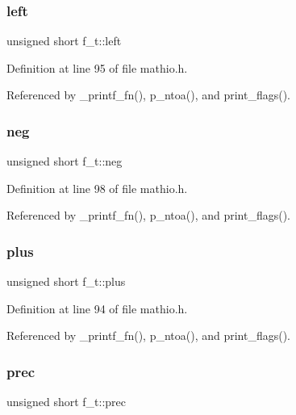 \subsubsection{\texorpdfstring{left}{left}}
{\footnotesize\ttfamily unsigned short f\+\_\+t\+::left}



Definition at line 95 of file mathio.\+h.



Referenced by \+\_\+printf\+\_\+fn(), p\+\_\+ntoa(), and print\+\_\+flags().

\mbox{\label{unionf__t_a08d5e77f0fdb784ab1ef1425625e23f7}} 
\subsubsection{\texorpdfstring{neg}{neg}}
{\footnotesize\ttfamily unsigned short f\+\_\+t\+::neg}



Definition at line 98 of file mathio.\+h.



Referenced by \+\_\+printf\+\_\+fn(), p\+\_\+ntoa(), and print\+\_\+flags().

\mbox{\label{unionf__t_a63ebe04d55417685e439b779dfa8dafe}} 
\subsubsection{\texorpdfstring{plus}{plus}}
{\footnotesize\ttfamily unsigned short f\+\_\+t\+::plus}



Definition at line 94 of file mathio.\+h.



Referenced by \+\_\+printf\+\_\+fn(), p\+\_\+ntoa(), and print\+\_\+flags().

\mbox{\label{unionf__t_afd9cfffafc044b616256b483e5444d92}} 
\subsubsection{\texorpdfstring{prec}{prec}}
{\footnotesize\ttfamily unsigned short f\+\_\+t\+::prec}



